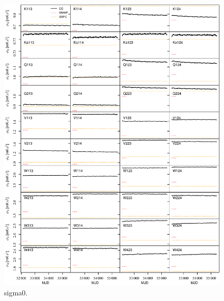 \documentclass[twocolumn]{../../common/aa}
\begin{document}
\begin{figure}[p]
  	\centering
	\includegraphics[width=\textwidth]{figures/instpar_CG_sigma0_v1.pdf}
	\caption{sigma0.}
	\label{fig:sigma0}
\end{figure}
\end{document}
